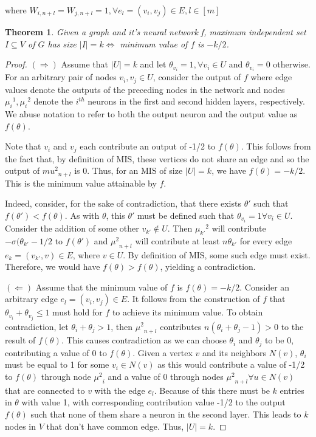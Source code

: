where $W_{i,n+l} = W_{j,n+l} = 1, \forall e_l = (v_i, v_j) \in E, l\in [m] $ 

\newtheorem{theorem}{Theorem}
\begin{theorem}
\label{minimum_f_value_theorem}
Given a graph \graphG and it's neural network f, maximum independent set $I \subseteq V$ of $G$ has size $|I| = k \iff$ minimum value of $f$ is $-k/2$. 
\end{theorem}
\begin{proof}
$(\Longrightarrow)$
Assume that $|U| = k$ and let $\theta_{v_i} = 1, \forall v_i \in U$ and $\theta_{v_i} = 0$ otherwise. For an arbitrary pair of nodes $v_i, v_j \in U$, consider the output of $f$ where edge values denote the outputs of the preceding nodes in the network and nodes ${\mu_i}^1, {\mu_i}^2$ denote the $i^{th}$ neurons in the first and second hidden layers, respectively. We abuse notation to refer to both the output neuron and the output value as $f(\theta)$.

Note that $v_i$ and $v_j$ each contribute an output of -1/2 to $f(\theta)$. This follows from the fact that, by definition of MIS, these vertices do not share an edge and so the output of ${mu^2}_{n+l}$ is 0.
Thus, for an MIS of size $|U| = k$,
we have $f(\theta)=-k/2$.
This is the minimum value attainable by $f$. 


Indeed, consider, for the sake of contradiction, that there exists $\theta'$ such that $f(\theta') < f(\theta)$. 
As with $\theta$, this $\theta'$ must be defined such that $\theta_{v_i} = 1 \forall v_i \in U$. Consider the addition of some other $v_{k'} \notin U$. Then ${\mu_{k'}}^2$ will contribute $-\sigma(\theta_{k'}-1/2$ to $f(\theta')$ 
and ${\mu^2}_{n+l}$ will contribute at least $n\theta_{k'}$ for every edge $e_k = (v_{k'}, v) \in E$, where $v \in U$. By definition of MIS, some such edge must exist. Therefore, we would have $f(\theta) > f(\theta)$, yielding a contradiction.

$(\Longleftarrow)$ Assume that the minimum value of $f$ is $f(\theta) = -k/2.$ Consider an arbitrary edge $e_l = (v_i, v_j) \in E$. It follows from the construction of $f$ that $\theta_{v_i} + \theta_{v_j} \leq 1$ must hold for $f$ to achieve its minimum value. To obtain contradiction, let $\theta_i + \theta_j > 1$, then ${\mu^2}_{n+l}$ contributes $n(\theta_i+\theta_j-1)>0$ to the result of $f(\theta)$. This causes contradiction as we can choose $\theta_i$ and $\theta_j$ to be 0, contributing a value of 0 to $f(\theta)$. 
Given a vertex $v$ and its neighbors $N(v)$, $\theta_i$ must be equal to 1 for
some $v_i \in N(v)$ as this would contribute a value of -1/2 to
$f(\theta)$ through node ${\mu^2}_i$ and a value of 0 through nodes ${\mu^2}_{n+l} \forall u \in N(v)$ that
are connected to $v$ with the edge $e_l$. Because of this there must be $k$ entries in $\theta$ with value 1, with corresponding contribution value -1/2 to the output $f(\theta)$ such that none of them share a neuron in the second layer. This leads to $k$ nodes in $V$ that don't have common edge. Thus, $|U| = k$. 
\end{proof}

